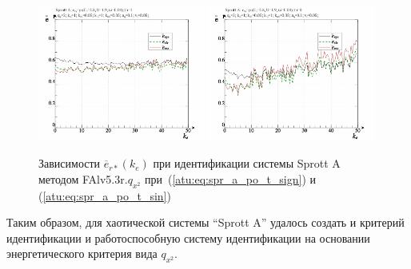 \begin{figure}[h!]
  \centerline{
    \includegraphics[width=0.49\textwidth]{p/cha/spr_a/FAlv5.3A/sprott_a_FAlv5x3r-p_ke_e_sign.png}
    \hfill
    \includegraphics[width=0.49\textwidth]{p/cha/spr_a/FAlv5.3A/sprott_a_FAlv5x3r-p_ke_e_sin.png}
  }
  \caption{Зависимости $\overline{e}_{r*}(k_e)$ при идентификации системы Sprott A методом FAlv5.3r.$q_{x^2}$
   при~(\ref{atu:eq:spr_a_po_t_sign}) и (\ref{atu:eq:spr_a_po_t_sin})}
  \label{atu:f:spr_a_k_e_FAlv5.3r.q_x2}
\end{figure}




Таким образом, для хаотической системы ``Sprott A''
удалось создать и критерий идентификации и работоспособную систему идентификации
на основании энергетического критерия вида $q_{x^2}$.


